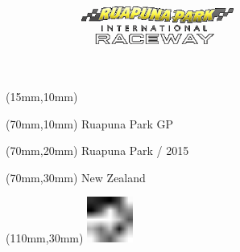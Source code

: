\null\newpage
\begin{textblock*}{50mm}(15mm,10mm)%
\includegraphics[width=50mm]{LG/RUA.png}
\end{textblock*}
\begin{textblock*}{130mm}(70mm,10mm)%
{\fontsize{20}{20}\selectfont Ruapuna Park GP}\\
\end{textblock*}
\begin{textblock*}{120mm}(70mm,20mm)%
{\fontsize{16}{16}\selectfont Ruapuna Park / 2015}\\
\end{textblock*}
\begin{textblock*}{120mm}(70mm,30mm)%
{\fontsize{12}{12}\selectfont New Zealand}
\end{textblock*}
\begin{textblock*}{30mm}(110mm,30mm)%
\centering
\includegraphics[height=15mm]{icons/fa-rotate-left.pdf}
\end{textblock*}
